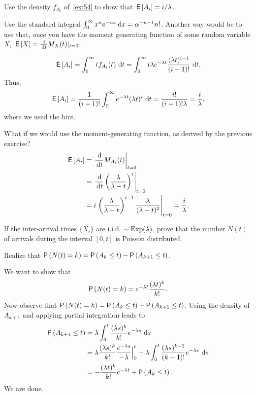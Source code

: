\begin{extra}
  Use the density $f_{A_i}$ of~\cref{ex:54} to show that $\,\mathsf{E}\left[A_i\right]=i/\lambda$. 
\begin{hint}
Use the standard integral 
    $\int_0^\infty x^n e^{-\alpha x} \,\text{d}x =
    \alpha^{-n-1}n!$. 
    Another way would be to use that, once you have the moment
    generating function of some random variable $X$,
    $\E X = \frac{\d}{\d t} M_X(t) |_{t=0}$. 
\end{hint}
\begin{solution}
  \begin{equation*}
\,\mathsf{E}\left[A_i\right] = \int_0^\infty t f_{A_i} (t) \, \,\text{d}t  = 
\int_0^\infty t  \lambda e^{-\lambda t} \frac{(\lambda t)^{i-1}}{(i-1)!}\, \,\text{d}t.
  \end{equation*}
Thus, 
  \begin{equation*}
\,\mathsf{E}\left[A_i\right] = \frac{1}{(i-1)!} \int_0^\infty   e^{-\lambda t} (\lambda t)^i\,\,\text{d}t = \frac{i!}{(i-1)!\lambda}=\frac{i}\lambda,
  \end{equation*}
  where we used the hint.

What if we would use the moment-generating function, as derived by the previous exercise?
\begin{align*}
    \E{A_i} 
&= \left.\frac{\d}{\d t} M_{A_i}(t)\right|_{t=0} \\
&= \left.\frac{\d}{\d t} \left(\frac{\lambda}{\lambda-t}\right)^i\right|_{t=0} \\
&= i \left.\left(\frac{\lambda}{\lambda-t}\right)^{i-1}\frac{\lambda}{(\lambda-t)^2}\right|_{t=0} 
= \frac i\lambda.
\end{align*}


\end{solution}
\end{extra}

\begin{exercise}
  If the inter-arrival times $\{X_i\}$ are i.i.d.
  $\sim \operatorname{Exp}(\lambda)$, prove that the number $N(t)$ of arrivals during the interval $[0,t]$ is Poisson distributed.
\begin{hint}
  Realize that
    $\P{N(t)=k} = \P{A_k \leq t} - \P{A_{k+1} \leq t}$.
\end{hint}
\begin{solution}
      We want to show that
    \begin{equation*}
      \P{N(t)=k} = e^{-\lambda t}\frac{(\lambda t)^k}{k!}.
    \end{equation*}
    Now observe that $\P{N(t)=k} = \P{A_k \leq t} - \P{A_{k+1} \leq t}$.
    Using the density of $A_{k+1}$ and applying partial integration leads to
\begin{align*}
\P{A_{k+1} \leq t} 
&= \lambda \int_0^t \frac{(\lambda s)^{k}}{k!}e^{-\lambda s}\, \d s \\
&= \lambda \frac{(\lambda s)^{k}}{k!}\frac{e^{-\lambda s}}{-\lambda} \Big|_{0}^t + \lambda \int_0^t \frac{(\lambda s)^{k-1}}{(k-1)!}e^{-\lambda s}\, \d s \\
&= - \frac{(\lambda t)^{k}}{k!} e^{-\lambda t} + \P{A_k \leq t}.
\end{align*}
We are done.
\end{solution}
\end{exercise}


